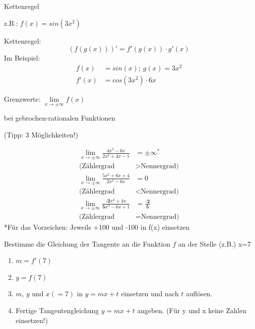 \begin{frage}Kettenregel
	
	z.B.: $f(x)={sin(3x^2)}$\end{frage}
\begin{antwort}Kettenregel:
	\[
	(f(g(x)))'=f'(g(x))\cdot g'(x)
	\]
	Im Beispiel:
	\begin{align*}
	f(x)&=sin(x);~ g(x)=3x^2 \\
	f'(x)&=cos(3x^2)\cdot 6x
	\end{align*}\end{antwort}
\begin{frage}Grenzwerte: $\lim\limits_{x \rightarrow \pm\infty}{f(x)}$
	\bigskip
	
	bei gebrochen-rationalen Funktionen
	
	(Tipp: 3 Möglichkeiten!)\end{frage}
\begin{antwort}\large
	\begin{align*}
	\lim\limits_{x \rightarrow \pm\infty}{\frac{4x^3 - 6x}{2x^2+4x-1}}&=\pm\infty^* \\
	\text{(Zählergrad } &> \text{Nennergrad)}
	\end{align*}
	\begin{align*}
	\lim\limits_{x \rightarrow \pm\infty}{\frac{5x^2+6x+4}{2x^4-6x}}&=0 \\
	\text{(Zählergrad } &< \text{Nennergrad)}
	\end{align*}
	\begin{align*}
	\lim\limits_{x \rightarrow \pm\infty}{\frac{\textbf{-2}x^3+4x}{\textbf{5}x^3 - 6x+1}}&=\frac{\textbf{-2}}{\textbf{5}} \\
	\text{(Zählergrad } &= \text{Nennergrad)}
	\end{align*}
	\footnotesize 
	*Für das Vorzeichen: Jeweils +100 und -100 in f(x) einsetzen\end{antwort}
\begin{frage}Bestimme die Gleichung der Tangente an die Funktion $f$ an der Stelle (z.B.) x=7\end{frage}
\begin{antwort}\begin{enumerate}
		\item $m=f'(7)$
		\item $y=f(7)$
		\item $m$, $y$ und $x(=7)$ in $y= mx+t$ einsetzen und nach $t$ auflösen.
		\item Fertige Tangentengleichung $y= mx+t$ angeben. (Für y und x keine Zahlen einsetzen!)
		
	\end{enumerate}\end{antwort}

